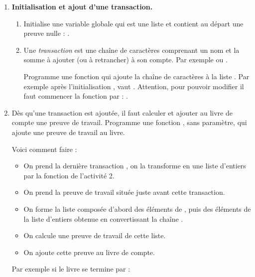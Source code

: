 \documentclass[11pt,class=report,crop=false]{standalone}
\begin{document}

\begin{activite}




\begin{enumerate}
  \item \textbf{Initialisation et ajout d'une transaction.}
  
  \begin{enumerate}
    \item Initialise une variable globale  qui est une liste et contient au départ une preuve nulle :  .
  
    \item Une \emph{transaction} est une chaîne de caractères comprenant un nom et la somme à ajouter (ou à retrancher) à son compte. Par exemple  ou .
    
    Programme une fonction  qui ajoute la chaîne de caractères  à la liste . 
Par exemple après l'initialisation ,  
     vaut \ci{[ [0,0,0,0,0,0], "Camille +100" ]}.
    Attention, pour pouvoir modifier  il faut commencer la fonction par : .
    
  \end{enumerate} 
  
   \item Dès qu'une transaction est ajoutée, il faut calculer et ajouter au livre de compte une preuve de travail. Programme une fonction , sans paramètre, qui ajoute une preuve de travail au livre.   
   
Voici comment faire :
  \begin{itemize}
    \item On prend la dernière transaction , on la transforme en une liste d'entiers par la fonction  de l'activité 2.
    \item On prend la preuve de travail  située juste avant cette transaction.
    \item On forme la liste  composée d'abord des éléments de , puis des éléments de la liste d'entiers obtenue en convertissant la chaîne .
    \item On calcule une preuve de travail de cette liste.
    \item  On ajoute cette preuve au livre de compte.
  \end{itemize}
  Par exemple si le livre se termine par :
  

\end{enumerate}
\end{activite}
\end{document}
